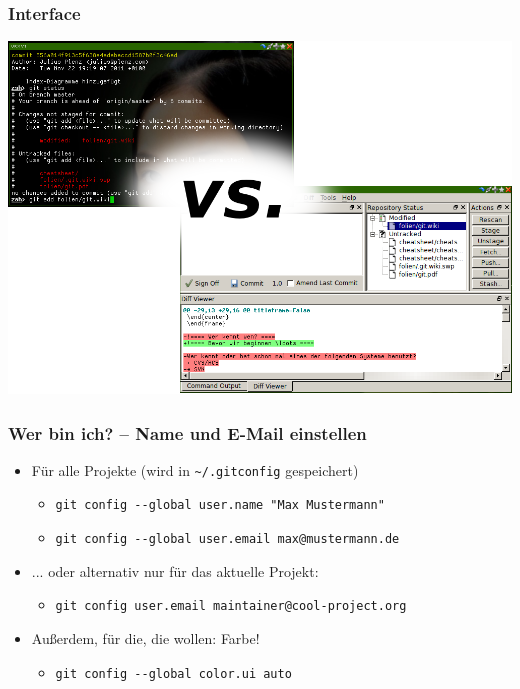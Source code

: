 \documentclass{beamer}
\begin{document}
\begin{frame}
 \frametitle{Interface}
  


\includegraphics[width=\textwidth]{bilder/shell-vs-gui.png}

  
 \end{frame}
\begin{frame}
 \frametitle{Wer bin ich? -- Name und E-Mail einstellen}
  


\begin{itemize}
  \item Für alle Projekte (wird in \texttt{\~{}/.gitconfig} gespeichert)
\begin{itemize}
  \item \texttt{git config -{}-global user.name "Max Mustermann"}
  \item \texttt{git config -{}-global user.email max@mustermann.de}
\end{itemize}
\end{itemize}

\begin{itemize}
  \item ... oder alternativ nur für das aktuelle Projekt:
\begin{itemize}
  \item \texttt{git config user.email maintainer@cool-project.org}
\end{itemize}
\end{itemize}

\begin{itemize}
  \item Außerdem, für die, die wollen: Farbe!
\begin{itemize}
  \item \texttt{git config -{}-global color.ui auto}
\end{itemize}
\end{itemize}

  
 \end{frame}
\end{document}
